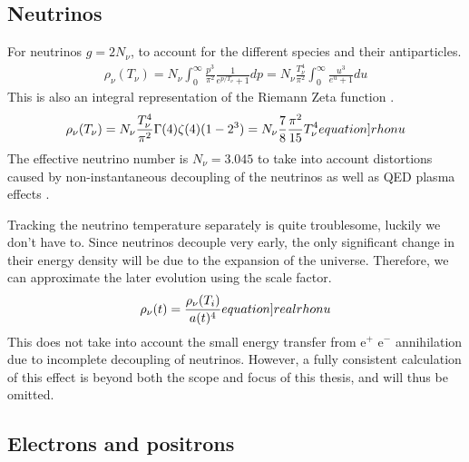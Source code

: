 \subsection{Neutrinos}

For neutrinos $g=2N_\nu$, to account for the different species and their antiparticles.
\begin{align}
    \rho_\nu(T_\nu)=N_\nu\int_{0}^{\infty} \frac{p^3}{\pi^2}\frac{1}{e^{p/T_\nu}+1}dp =  N_\nu\frac{T_\nu^4}{\pi^2}\int_{0}^{\infty}\frac{u^3}{e^{u}+1}du
\end{align}
This is also an integral representation of the Riemann Zeta function \cite[\href{https://dlmf.nist.gov/25.5.E3}{(25.5.3)}]{NIST:DLMF}.
\begin{align}
    \rho_\nu(T_\nu)=N_\nu\frac{T_\nu^4}{\pi^2}\Gamma(4)\zeta(4)(1-2^3)=N_\nu\frac{7}{8}\frac{\pi^2}{15}T_\nu^4
    \label[equation]{rhonu}
\end{align}
The effective neutrino number is $N_\nu=3.045$ to take into account distortions caused by non-instantaneous decoupling of the neutrinos as well as QED plasma effects \cite{de_Salas_2016}.

Tracking the neutrino temperature separately is quite troublesome, luckily we don't have to. Since neutrinos decouple very early, the only significant change in their energy density will be due to the expansion of the universe. Therefore, we can approximate the later evolution using the scale factor.
\begin{align}
    \rho_\nu(t)=\frac{\rho_\nu(T_i)}{a(t)^4}
    \label[equation]{realrhonu}
\end{align}
This does not take into account the small energy transfer from e${^+}$ e${^-}$ annihilation due to incomplete decoupling of neutrinos. However, a fully consistent calculation of this effect is beyond both the scope and focus of this thesis, and will thus be omitted. 

\subsection{Electrons and positrons}


